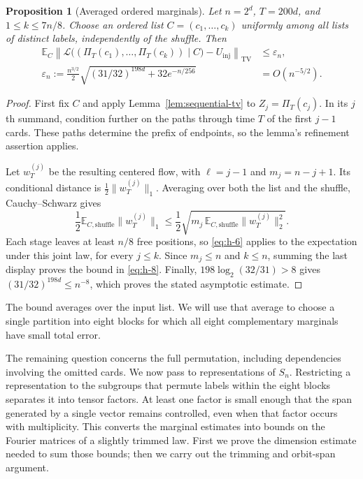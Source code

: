\documentclass[11pt]{article}
\newtheorem{proposition}[theorem]{Proposition}
\theoremstyle{remark}
\numberwithin{equation}{section}
\begin{document}
\begin{proposition}[Averaged ordered marginals]\label{prop:averaged-marginal}
Let \(n=2^d\), \(T=200d\), and \(1\le k\le7n/8\). Choose an ordered list \(C=(c_1,\ldots,c_k)\) uniformly among all lists of distinct labels, independently of the shuffle. Then
\begin{equation}\label{eq:h-8}
 \begin{aligned}
 \mathbb E_C
 \left\|\mathcal L\bigl((\Pi_T(c_1),\ldots,\Pi_T(c_k))\mid C\bigr)
       -U_{\mathrm{inj}}\right\|_{\mathrm{TV}}
 &\le\varepsilon_n,\\
 \varepsilon_n:=\frac{n^{3/2}}2
  \sqrt{(31/32)^{198d}+32e^{-n/256}}
 &=O(n^{-5/2}).
 \end{aligned}
\end{equation}
\end{proposition}
\begin{proof}
First fix \(C\) and apply Lemma~\ref{lem:sequential-tv} to \(Z_j=\Pi_T(c_j)\). In its \(j\)th summand, condition further on the paths through time \(T\) of the first \(j-1\) cards. These paths determine the prefix of endpoints, so the lemma's refinement assertion applies.

Let \(w_T^{(j)}\) be the resulting centered flow, with \(\ell=j-1\) and \(m_j=n-j+1\). Its conditional distance is \(\frac12\|w_T^{(j)}\|_1\). Averaging over both the list and the shuffle, Cauchy--Schwarz gives
\[
 \frac12\mathbb E_{C,\mathrm{shuffle}}\|w_T^{(j)}\|_1
 \le\frac12\sqrt{m_j\,
       \mathbb E_{C,\mathrm{shuffle}}\|w_T^{(j)}\|_2^2}.
\]
Each stage leaves at least \(n/8\) free positions, so \eqref{eq:h-6} applies to the expectation under this joint law, for every \(j\le k\). Since \(m_j\le n\) and \(k\le n\), summing the last display proves the bound in \eqref{eq:h-8}. Finally, \(198\log_2(32/31)>8\) gives \((31/32)^{198d}\le n^{-8}\), which proves the stated asymptotic estimate.
\end{proof}
The bound averages over the input list. We will use that average to choose a single partition into eight blocks for which all eight complementary marginals have small total error.

The remaining question concerns the full permutation, including dependencies involving the omitted cards. We now pass to representations of \(S_n\). Restricting a representation to the subgroups that permute labels within the eight blocks separates it into tensor factors. At least one factor is small enough that the span generated by a single vector remains controlled, even when that factor occurs with multiplicity. This converts the marginal estimates into bounds on the Fourier matrices of a slightly trimmed law. First we prove the dimension estimate needed to sum those bounds; then we carry out the trimming and orbit-span argument.
\end{document}

